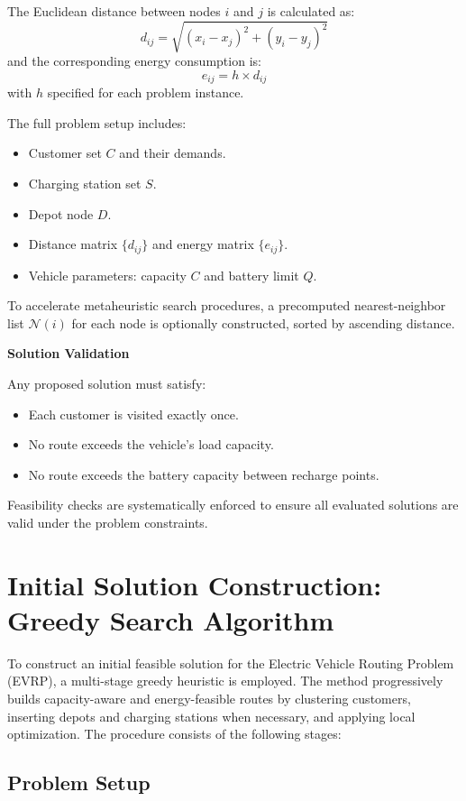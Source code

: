The Euclidean distance between nodes \( i \) and \( j \) is calculated as:
\[
d_{ij} = \sqrt{(x_i - x_j)^2 + (y_i - y_j)^2}
\]
and the corresponding energy consumption is:
\[
e_{ij} = h \times d_{ij}
\]
with \( h \) specified for each problem instance.

The full problem setup includes:
\begin{itemize}
    \item Customer set \( C \) and their demands.
    \item Charging station set \( S \).
    \item Depot node \( D \).
    \item Distance matrix \( \{ d_{ij} \} \) and energy matrix \( \{ e_{ij} \} \).
    \item Vehicle parameters: capacity \( C \) and battery limit \( Q \).
\end{itemize}

To accelerate metaheuristic search procedures, a precomputed nearest-neighbor list \( \mathcal{N}(i) \) for each node is optionally constructed, sorted by ascending distance.

\bigskip
\noindent\textbf{Solution Validation}

Any proposed solution must satisfy:
\begin{itemize}
    \item Each customer is visited exactly once.
    \item No route exceeds the vehicle's load capacity.
    \item No route exceeds the battery capacity between recharge points.
\end{itemize}
Feasibility checks are systematically enforced to ensure all evaluated solutions are valid under the problem constraints.


\section{Initial Solution Construction: Greedy Search Algorithm}
\label{sec:greedy_search}

To construct an initial feasible solution for the Electric Vehicle Routing Problem (EVRP), a multi-stage greedy heuristic is employed.  
The method progressively builds capacity-aware and energy-feasible routes by clustering customers, inserting depots and charging stations when necessary, and applying local optimization. The procedure consists of the following stages:

\subsection{Problem Setup}

